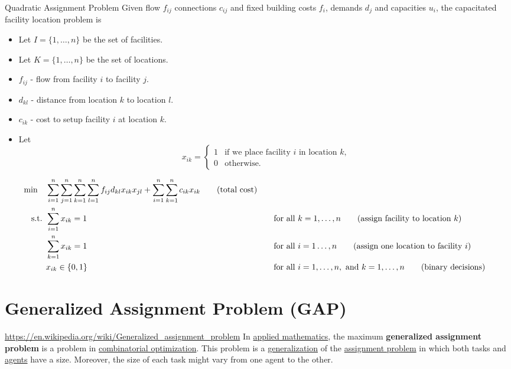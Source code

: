\begin{general}{Quadratic Assignment Problem}{\npcomplete}
Given flow $f_{ij}$  connections $c_{ij}$ and fixed building costs $f_i$, demands $d_j$ and capacities $u_i$, the capacitated facility location problem is 

\begin{itemize}
\item Let $I = \{1,\dots, n\}$ be the set of facilities.
\item Let $K = \{1, \dots, n\}$ be the set of locations.
\end{itemize}

\begin{itemize}
\item $f_{ij}$ - flow from facility $i$ to facility $j$.
\item $d_{kl}$ - distance from location $k$ to location $l$.
\item $c_{ik}$ - cost to setup facility $i$ at location $k$.
\end{itemize}

\begin{itemize}
\item Let 
\begin{equation*}
x_{ik} = \begin{cases}
1 & \text{if we place facility $i$ in location $k$,}\\
0 & \text{otherwise.}
\end{cases}
\end{equation*}
\end{itemize}

\begin{align}
\min \quad & \displaystyle\sum_{i=1}^n\sum_{j=1}^n \sum_{k=1}^n \sum_{l = 1}^n f_{ij}d_{kl}x_{ik}x_{jl} + \sum_{i=1}^n \sum_{k = 1}^n c_{ik} x_{ik}   \tag{total cost} \\
\mbox{ s.t. }        & \displaystyle\sum_{i=1}^n x_{ik}=1 &&\quad \mbox{for all } k=1,\dots,n   \tag{assign facility to location $k$} \\
& \displaystyle \sum_{k=1}^n x_{ik}=1 &&\quad \mbox{for all } i=1\dots,n   \tag{assign one location to facility $i$} \\
& x_{ik}\in\{0,1\} &&\quad \mbox{for all } i=1,\dots,n, \mbox{ and } k = 1, \dots, n   \tag{binary decisions}
\end{align}
\end{general}

\section{Generalized Assignment Problem (GAP)}
\url{https://en.wikipedia.org/wiki/Generalized_assignment_problem}
In \href{applied_mathematics}{applied mathematics}, the maximum
\textbf{generalized assignment problem} is a problem in
\href{combinatorial_optimization}{combinatorial optimization}. This
problem is a \url{generalization} of the
\href{assignment_problem}{assignment problem} in which both tasks and
\href{Agent-based_model}{agents} have a size. Moreover, the size of each
task might vary from one agent to the other.

